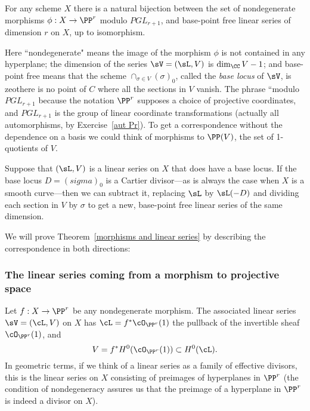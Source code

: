 \begin{theorem}\label{morphisms and linear series}
For any scheme $X$ there is a natural bijection between the set of nondegenerate morphisms $\phi : X \to \PP^r$ modulo $PGL_{r+1}$, and base-point free linear series of dimension $r$ on $X$, up to isomorphism.
\end{theorem}

Here ``nondegenerate" means the image of the morphism $\phi$ is not contained in any hyperplane; the dimension of the series
 $\sV  = (\sL, V)$ is $\dim_\CC V -1$; and base-point free means that the scheme $\cap_{\sigma\in V}(\sigma)_0$, called the  \emph{base locus} of $\sV$, is zeothere is no point of $C$ where all the sections in $V$
vanish. The phrase ``modulo $PGL_{r+1}$ because the notation $\PP^r$ supposes a choice of projective coordinates, and
$PGL_{r+1}$ is the group of linear coordinate transformations (actually all automorphisms, by Exercise~\ref{aut Pr}).
To get a correspondence without the dependence on a basis we could think of morphisms to $\PP(V)$, the set of 1-quotients of $V$.

Suppose that $(\sL, V)$ is a linear series on $X$ that does have a base locus. If the base locus $D = (sigma)_0$ is a Cartier divisor---as is always the
case when $X$ is a smooth curve---then we can subtract it, replacing $\sL$ by $\sL(-D)$ and dividing each section in $V$
by $\sigma$ to get a new, base-point free linear series of the same dimension. 

We will prove Theorem~\ref{morphisms and linear series} by describing the correspondence in both directions:

\subsubsection{The linear series coming from a morphism to projective space}\label{series from morphism}

Let $f : X \to \PP^r$ be any nondegenerate morphism. The associated linear series $\sV = (\cL, V)$ on $X$ has $\cL = f^*\cO_{\PP^r}(1)$ the pullback of the invertible sheaf $\cO_{\PP^r}(1)$, and 
$$
V = f^*H^0(\cO_{\PP^r}(1)) \subset H^0(\cL).
$$
In geometric terms, if we think of a linear series as a family of effective divisors, this is the linear series on $X$ consisting of preimages of hyperplanes in $\PP^r$ (the condition of nondegeneracy assures us that the preimage of a hyperplane in $\PP^r$ is indeed a divisor on $X$).


